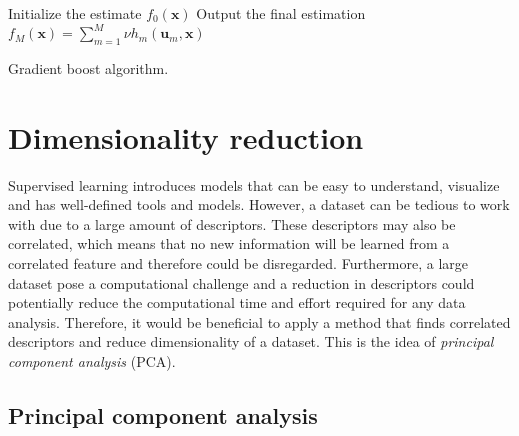 \begin{algorithm}[H]
\SetAlgoLined
  Initialize the estimate $f_0(\boldsymbol{x})$\;
 Output the final estimation $f_M(\boldsymbol{x}) = \sum_{m=1}^M \nu h_m (\boldsymbol{u}_m, \boldsymbol{x})$
 \caption{Gradient boost algorithm.}
 \label{alg:gradientBoost}
\end{algorithm}

\section{Dimensionality reduction}
Supervised learning introduces models that can be easy to understand, visualize and has well-defined tools and models. However, a dataset can be tedious to work with due to a large amount of descriptors. These descriptors may also be correlated, which means that no new information will be learned from a correlated feature and therefore could be disregarded. Furthermore, a large dataset pose a computational challenge and a reduction in descriptors could potentially reduce the computational time and effort required for any data analysis. Therefore, it would be beneficial to apply a method that finds correlated descriptors and reduce dimensionality of a dataset. This is the idea of \textit{principal component analysis} (PCA).


\subsection{Principal component analysis}
\label{pca}

